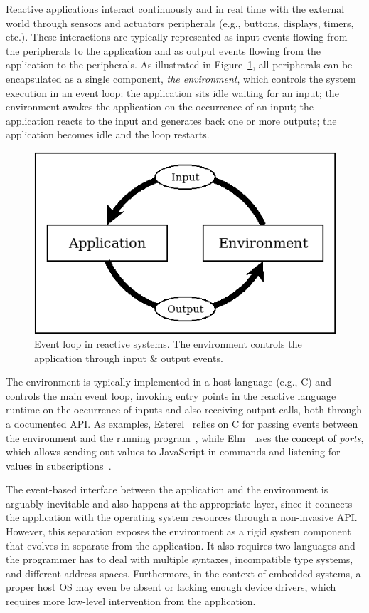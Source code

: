 \documentclass[sigplan,10pt,review,anonymous]{acmart}\settopmatter{printfolios=true,printccs=false,printacmref=false}
\begin{document}
Reactive applications interact continuously and in real time with the external
world through sensors and actuators peripherals (e.g., buttons, displays,
timers, etc.).
%
These interactions are typically represented as input events flowing from the
peripherals to the application and as output events flowing from the
application to the peripherals.
%
As illustrated in Figure~\ref{fig.env}, all peripherals can be encapsulated as
a single component, \emph{the environment}, which controls the system execution
in an event loop:
the application sits idle waiting for an input;
the environment awakes the application on the occurrence of an input;
the application reacts to the input and generates back one or more outputs;
the application becomes idle and the loop restarts.

\begin{figure}
\centering
\includegraphics[width=\linewidth]{loop}
\caption{ Event loop in reactive systems.
          The environment controls the application through input \& output
          events.
\label{fig.env}
}
\end{figure}

The environment is typically implemented in a host language (e.g., C) and
controls the main event loop, invoking entry points in the reactive language
runtime on the occurrence of inputs and also receiving output calls, both
through a documented API.
%
As examples, Esterel~\cite{esterel.ieee91} relies on C for passing events
between the environment and the running program~\cite{esterel.book.compiling},
while Elm~\cite{frp.elm} uses the concept of \emph{ports}, which allows sending
out values to JavaScript in commands and listening for values in
subscriptions~\cite{frp.elm.ports}.

The event-based interface between the application and the environment is
arguably inevitable and also happens at the appropriate layer, since it
connects the application with the operating system resources through a
non-invasive API.
%
However, this separation exposes the environment as a rigid system component
that evolves in separate from the application.
%
It also requires two languages and the programmer has to deal with multiple
syntaxes, incompatible type systems, and different address spaces.
%
Furthermore, in the context of embedded systems, a proper host OS may even be
absent or lacking enough device drivers, which requires more low-level
intervention from the application.
\end{document}
